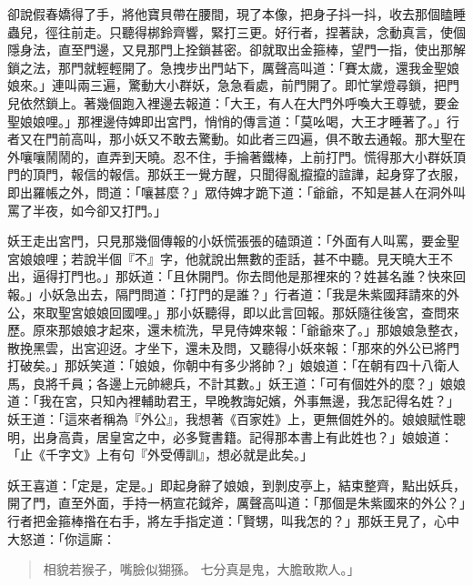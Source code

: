 卻說假春嬌得了手，將他寶貝帶在腰間，現了本像，把身子抖一抖，收去那個瞌睡蟲兒，徑往前走。只聽得梆鈴齊響，緊打三更。好行者，捏著訣，念動真言，使個隱身法，直至門邊，又見那門上拴鎖甚密。卻就取出金箍棒，望門一指，使出那解鎖之法，那門就輕輕開了。急拽步出門站下，厲聲高叫道：「賽太歲，還我金聖娘娘來。」連叫兩三遍，驚動大小群妖，急急看處，前門開了。即忙掌燈尋鎖，把門兒依然鎖上。著幾個跑入裡邊去報道：「大王，有人在大門外呼喚大王尊號，要金聖娘娘哩。」那裡邊侍婢即出宮門，悄悄的傳言道：「莫吆喝，大王才睡著了。」行者又在門前高叫，那小妖又不敢去驚動。如此者三四遍，俱不敢去通報。那大聖在外嚷嚷鬧鬧的，直弄到天曉。忍不住，手掄著鐵棒，上前打門。慌得那大小群妖頂門的頂門，報信的報信。那妖王一覺方醒，只聞得亂攛攛的諠譁，起身穿了衣服，即出羅帳之外，問道：「嚷甚麼？」眾侍婢才跪下道：「爺爺，不知是甚人在洞外叫罵了半夜，如今卻又打門。」

妖王走出宮門，只見那幾個傳報的小妖慌張張的磕頭道：「外面有人叫罵，要金聖宮娘娘哩；若說半個『不』字，他就說出無數的歪話，甚不中聽。見天曉大王不出，逼得打門也。」那妖道：「且休開門。你去問他是那裡來的？姓甚名誰？快來回報。」小妖急出去，隔門問道：「打門的是誰？」行者道：「我是朱紫國拜請來的外公，來取聖宮娘娘回國哩。」那小妖聽得，即以此言回報。那妖隨往後宮，查問來歷。原來那娘娘才起來，還未梳洗，早見侍婢來報：「爺爺來了。」那娘娘急整衣，散挽黑雲，出宮迎迓。才坐下，還未及問，又聽得小妖來報：「那來的外公已將門打破矣。」那妖笑道：「娘娘，你朝中有多少將帥？」娘娘道：「在朝有四十八衛人馬，良將千員；各邊上元帥總兵，不計其數。」妖王道：「可有個姓外的麼？」娘娘道：「我在宮，只知內裡輔助君王，早晚教誨妃嬪，外事無邊，我怎記得名姓？」妖王道：「這來者稱為『外公』，我想著《百家姓》上，更無個姓外的。娘娘賦性聰明，出身高貴，居皇宮之中，必多覽書籍。記得那本書上有此姓也？」娘娘道：「止《千字文》上有句『外受傅訓』，想必就是此矣。」

妖王喜道：「定是，定是。」即起身辭了娘娘，到剝皮亭上，結束整齊，點出妖兵，開了門，直至外面，手持一柄宣花鉞斧，厲聲高叫道：「那個是朱紫國來的外公？」行者把金箍棒揝在右手，將左手指定道：「賢甥，叫我怎的？」那妖王見了，心中大怒道：「你這廝：
\begin{quote}
相貌若猴子，嘴臉似猢猻。
七分真是鬼，大膽敢欺人。」
\end{quote}

